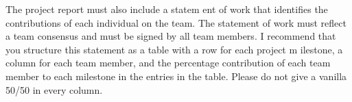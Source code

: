 The project report must also include a statem
ent of work that identifies the
contributions of each individual on the team. The statement of work must reflect a team consensus
and must be signed by all team members. I recommend that you structure this statement as a table
with a row for each project m
ilestone, a column for each team member, and the percentage
contribution of each team member to each milestone in the entries in the table. Please do not give
a vanilla 50/50 in every column. 

\blindtext
